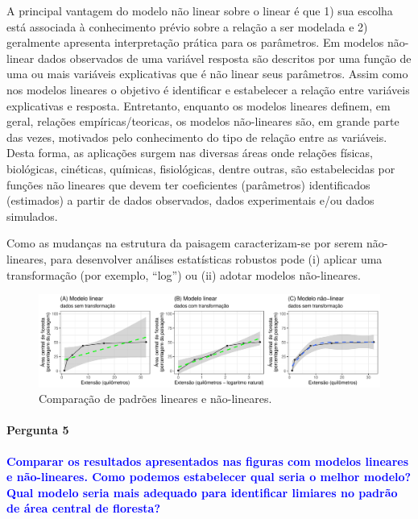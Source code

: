 \documentclass[
]{article}
\begin{document}
A principal vantagem do modelo não linear sobre o linear é que 1) sua
escolha está associada à conhecimento prévio sobre a relação a ser modelada e 2) geralmente apresenta interpretação prática para os parâmetros. Em modelos não-linear dados observados de uma variável resposta são descritos por uma função de uma ou mais variáveis explicativas que é não linear seus parâmetros. Assim como nos modelos lineares o objetivo é identificar e estabelecer a relação entre variáveis explicativas e resposta. Entretanto, enquanto os modelos lineares definem, em geral, relações empíricas/teoricas, os modelos não-lineares são, em grande parte das vezes, motivados pelo conhecimento do tipo de relação entre as variáveis. Desta forma, as aplicações surgem nas diversas áreas onde relações físicas, biológicas, cinéticas, químicas, fisiológicas, dentre outras, são estabelecidas por funções não lineares que devem ter coeficientes (parâmetros) identificados (estimados) a partir de dados observados, dados experimentais e/ou dados simulados.

Como as mudanças na estrutura da paisagem caracterizam-se por serem não-lineares, para desenvolver análises estatísticas robustos pode (i) aplicar uma transformação (por exemplo, ``log'') ou (ii) adotar modelos não-lineares.

\begin{figure}
\includegraphics[width=0.98\linewidth,height=0.98\textheight]{figures/fig_comp_linear} \caption{Comparação de padrões lineares e não-lineares.}\label{fig:met-insert-fig-comp2}
\end{figure}

\hypertarget{pergunta-5-1}{%
\paragraph{Pergunta 5}\label{pergunta-5-1}}

\textcolor{blue}{\textbf{Comparar os resultados apresentados nas figuras com modelos lineares e não-lineares. Como podemos estabelecer qual seria o melhor modelo? Qual modelo seria mais adequado para identificar limiares no padrão de área central de floresta?}}
\end{document}
